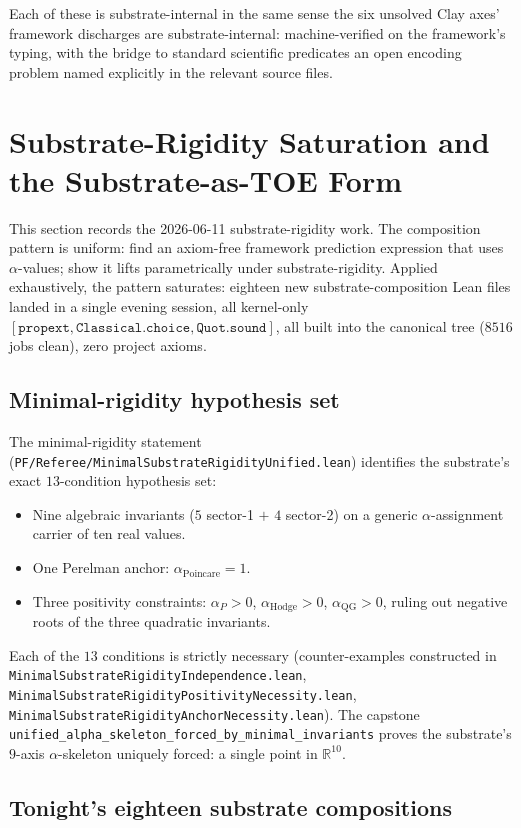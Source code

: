 \documentclass[11pt,a4paper]{article}
\theoremstyle{plain}
\theoremstyle{definition}
\theoremstyle{remark}
\newcommand{\aPo}{\alpha_{\mathrm{Poincare}}}
\newcommand{\aP}{\alpha_{P}}
\newcommand{\aHodge}{\alpha_{\mathrm{Hodge}}}
\newcommand{\aQG}{\alpha_{\mathrm{QG}}}
\newcommand{\code}[1]{\texttt{#1}}
\begin{document}
Each of these is substrate-internal in the same sense the
six unsolved Clay axes' framework discharges are
substrate-internal: machine-verified on the framework's typing,
with the bridge to standard scientific predicates an open
encoding problem named explicitly in the relevant source files.

\section{Substrate-Rigidity Saturation and the Substrate-as-TOE Form}
\label{sec:substrate-rigidity-saturation}

This section records the 2026-06-11 substrate-rigidity work.
The composition pattern is uniform: find an axiom-free framework
prediction expression that uses $\alpha$-values; show it lifts
parametrically under substrate-rigidity. Applied exhaustively,
the pattern saturates: eighteen new substrate-composition Lean
files landed in a single evening session, all kernel-only
$[\code{propext}, \code{Classical.choice}, \code{Quot.sound}]$,
all built into the canonical tree ($8516$ jobs clean), zero
project axioms.

\subsection*{Minimal-rigidity hypothesis set}

The minimal-rigidity statement
(\code{PF/Referee/MinimalSubstrateRigidityUnified.lean})
identifies the substrate's exact $13$-condition hypothesis
set:
\begin{itemize}
\item Nine algebraic invariants ($5$ sector-1 $+$ $4$ sector-2)
on a generic $\alpha$-assignment carrier of ten real values.
\item One Perelman anchor: $\aPo = 1$.
\item Three positivity constraints: $\aP > 0$, $\aHodge > 0$,
$\aQG > 0$, ruling out negative roots of the three quadratic
invariants.
\end{itemize}
Each of the $13$ conditions is strictly necessary (counter-examples
constructed in
\code{MinimalSubstrateRigidityIndependence.lean},
\code{MinimalSubstrateRigidityPositivityNecessity.lean},
\code{MinimalSubstrateRigidityAnchorNecessity.lean}).
The capstone
\code{unified\_alpha\_skeleton\_forced\_by\_minimal\_invariants}
proves the substrate's $9$-axis $\alpha$-skeleton uniquely
forced: a single point in $\mathbb{R}^{10}$.

\subsection*{Tonight's eighteen substrate compositions}
\end{document}
